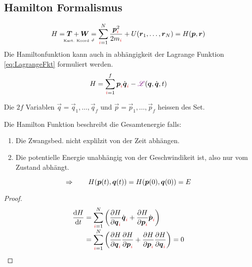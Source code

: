 \subsection{Hamilton Formalismus}
\label{subsec:Hamilton_Formalismus}
\begin{defnbox}\nospacing
  \begin{defn}[Hamiltonfunktion]
    \begin{align}
      H=\vec{T}+\vec{W}\bdla{=}{\normalfont{Kart. Koord}}
      \sum_{\idxi=1}^N\frac{\vec{p}_{\idxi}^2}{2m_{\idxi}}+U(\vec{r}_1,\ldots,\vec{r}_N)=H(\vec{p},\vec{r})
    \end{align}
    Die Hamiltonfunktion kann auch in abhängigkeit der Lagrange Funktion \cref{eq:LagrangeFkt} formuliert werden.
    \begin{align}
      H=\sum_{\idxi=1}^f\vec{p}_{\idxi}\dot{\vec{q}}_{\idxi}-\LT(\vec{q},\dot{\vec{q}},t)
    \end{align}
  \end{defn}
\end{defnbox}
\begin{notebox}[Bemerkungen]
  \begin{numberlist}
      \item Die $2f$ Variablen $\vec{q}=\vec{q}_1,\ldots,\vec{q}_f$ und $\vec{p}=\vec{p}_1,\ldots,\vec{p}_f$ heissen
     des Set.
      \item Die Hamilton Funktion beschreibt die Gesamtenergie falls:
    \begin{enumerate}
        \item Die Zwangsbed. nicht explilzit von der Zeit abhängen.
        \item Die potentielle Energie unabhängig von der Geschwindikeit ist, also nur vom Zustand abhängt.
    \end{enumerate}
    \[\Rightarrow\qquad H(\boldsymbol p (t),\boldsymbol q (t))=H(\boldsymbol p (0),\boldsymbol q (0))=E\]
  \end{numberlist}
  \begin{proofbox}\nospacing
		  \begin{proof}
        \begin{align*}
          \difrac{H}{t}&=\sum_{\idxi=1}^N\left(\pfrac{H}{\qvi}\qdvi+\pfrac{H}{\pvi}\pdvi\right)\nalign
          &=\sum_{\idxi=1}^N\left(\pfrac{H}{\qvi}\pfrac{H}{\pvi}+\pfrac{H}{\pvi}\pfrac{H}{\qvi}\right)=0
        \end{align*}
      \end{proof}
  \end{proofbox}
\end{notebox}

